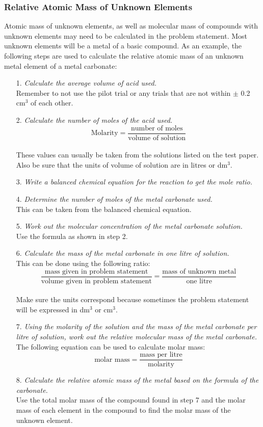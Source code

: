 \subsubsection{Relative Atomic Mass of Unknown Elements}

Atomic mass of unknown elements, as well as molecular mass of compounds with unknown elements may need to be calculated in the problem statement. Most unknown elements will be a metal of a basic compound. As an example, the following steps are used to calculate the relative atomic mass of an unknown metal element of a metal carbonate:

\begin{enumerate}
\item[1.] \textit{Calculate the average volume of acid used.}\\
Remember to not use the pilot trial or any trials that are not within $\pm$ 0.2 cm$^3$ of each other.
\item[2.] \textit{Calculate the number of moles of the acid used.}\\
$$\text{Molarity} = \frac{\text{number of moles}}{\text{volume of solution}}$$\\
These values can usually be taken from the solutions listed on the test paper. Also be sure that the units of volume of solution are in litres or dm$^3$.
\item[3.] \textit{Write a balanced chemical equation for the reaction to get the mole ratio.}
\item[4.] \textit{Determine the number of moles of the metal carbonate used.}\\
This can be taken from the balanced chemical equation.
\item[5.] \textit{Work out the molecular concentration of the metal carbonate solution.}\\
Use the formula as shown in step 2.
\item[6.] \textit{Calculate the mass of the metal carbonate in one litre of solution.}\\
This can be done using the following ratio:\\
$$\frac{\text{mass given in problem statement}}{\text{volume given in problem statement}} = \frac{\text{mass of unknown metal}}{\text{one litre}}$$\\
Make sure the units correspond because sometimes the problem statement will be expressed in dm$^3$ or cm$^3$.
\item[7.] \textit{Using the molarity of the solution and the mass of the metal carbonate per litre of solution, work out the relative molecular mass of the metal carbonate.}\\
The following equation can be used to calculate molar mass:\\
$$\text{molar mass} = \frac{\text{mass per litre}}{\text{molarity}}$$
\item[8.] \textit{Calculate the relative atomic mass of the metal based on the formula of the carbonate.}\\
Use the total molar mass of the compound found in step 7 and the molar mass of each element in the compound to find the molar mass of the unknown element.
\end{enumerate}
